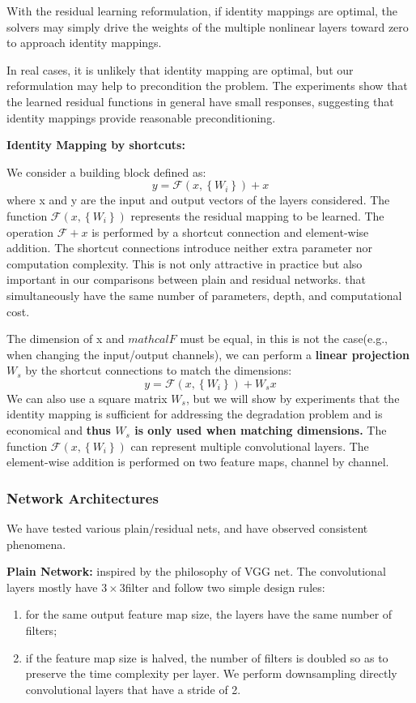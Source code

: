 \documentclass[11pt,en,bibstyle=ieeetr]{elegantpaper}
\begin{document}
With the residual learning reformulation, if identity mappings are optimal, the solvers may 
simply drive the weights of the multiple nonlinear layers toward zero to approach identity mappings.

In real cases, it is unlikely that identity mapping are optimal, but our reformulation may help 
to precondition the problem.
The experiments show that the learned residual functions in general have small responses, suggesting that identity mappings provide reasonable preconditioning.

\textbf{Identity Mapping by shortcuts:}

We consider a building block defined as: 
$$ 
y = \mathcal{F}(x,\left\{ W_i \right\} )+x
$$
where x and y are the input and output vectors of the layers considered.
The function $ \mathcal{F}(x,\left\{ W_i \right\} ) $ represents the residual mapping to be learned.
The operation $ \mathcal{F}+x$ is performed by a shortcut connection and element-wise addition.
The shortcut connections introduce neither extra parameter nor computation complexity. This is not only
attractive in practice but also important in our comparisons between plain and residual networks.
that simultaneously have the same number of parameters, depth, and computational cost.

The dimension of x and $ mathcal{F} $ must be equal, in this is not the case(e.g., when changing the input/output channels),
we can perform a \textbf{linear projection $ W_s $ }by the shortcut connections to match the dimensions:
$$ 
y = \mathcal{F}(x,\left\{ W_i \right\} )+W_s x
$$
We can also use a  square matrix $ W_s $, but we will show by experiments that the identity mapping
is sufficient for addressing the degradation problem and is economical and \textbf{thus $ W_s $ is only used when matching dimensions.}
The function $ \mathcal{F}(x,\left\{ W_i \right\} ) $ can represent multiple convolutional layers. The element-wise addition is performed
on two feature maps, channel by channel.

\subsubsection{Network Architectures}
We have tested various plain/residual nets, and have observed consistent phenomena.

\textbf{Plain Network:} inspired by the philosophy of VGG net. The convolutional layers mostly have $ 3\times 3 $filter and follow two simple 
design rules:
\begin{enumerate}
		\item for the same output feature map size, the layers have the same number of filters;
		\item if the feature map size is halved, the number of filters is doubled so as to preserve the time complexity per layer. We perform downsampling directly convolutional layers that have a stride of 2.
\end{enumerate}
\end{document}

